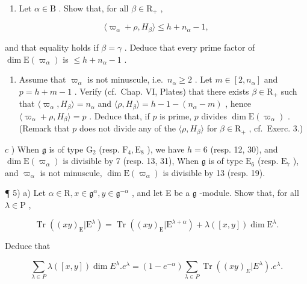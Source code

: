 \begin{enumerate}
\def\labelenumi{\alph{enumi})}
\tightlist
\item
  Let \(\alpha \in \mathrm{B}\) . Show that, for all \(\beta \in \mathrm{R}_{+}\) ,
\end{enumerate}

\[
\langle \varpi_ {\alpha} + \rho , H _ {\beta} \rangle \leq h + n _ {\alpha} - 1,
\]

and that equality holds if \(\beta = \gamma\) . Deduce that every prime factor of \(\dim \mathrm{E}(\varpi_{\alpha})\) is \(\leq h + n_{\alpha} - 1\) .

\begin{enumerate}
\def\labelenumi{\alph{enumi})}
\setcounter{enumi}{1}
\tightlist
\item
  Assume that \(\varpi_{\alpha}\) is not minuscule, i.e.~\(n_{\alpha} \geq 2\) . Let \(m \in [2, n_{\alpha}]\) and \(p = h + m - 1\) . Verify (cf.~Chap. VI, Plates) that there exists \(\beta \in \mathrm{R}_{+}\) such that \(\langle \varpi_{\alpha}, H_{\beta} \rangle = n_{\alpha}\) and \(\langle \rho, H_{\beta} \rangle = h - 1 - (n_{\alpha} - m)\) , hence \(\langle \varpi_{\alpha} + \rho, H_{\beta} \rangle = p\) . Deduce that, if \(p\) is prime, \(p\) divides \(\dim \mathrm{E}(\varpi_{\alpha})\) . (Remark that \(p\) does not divide any of the \(\langle \rho, H_{\beta} \rangle\) for \(\beta \in \mathrm{R}_{+}\) , cf.~Exerc. 3.)
\end{enumerate}

\(c\) ) When \(\mathfrak{g}\) is of type \(\mathrm{G}_2\) (resp. \(\mathrm{F}_4,\mathrm{E}_8\) ), we have \(h = 6\) (resp. 12, 30), and \(\dim \mathrm{E}(\varpi_{\alpha})\) is divisible by 7 (resp. 13, 31), When \(\mathfrak{g}\) is of type \(\mathrm{E}_6\) (resp. \(\mathrm{E}_7\) ), and \(\varpi_{\alpha}\) is not minuscule, \(\dim \mathrm{E}(\varpi_{\alpha})\) is divisible by 13 (resp. 19).

¶ 5) a) Let \(\alpha \in \mathrm{R}, x \in \mathfrak{g}^{\alpha}, y \in \mathfrak{g}^{-\alpha}\) , and let E be a \(\mathfrak{g}\) -module. Show that, for all \(\lambda \in \mathrm{P}\) ,

\[
\operatorname{Tr} ((x y) _ {\mathrm{E}} | \mathrm{E} ^ {\lambda}) = \operatorname{Tr} ((x y) _ {\mathrm{E}} | \mathrm{E} ^ {\lambda + \alpha}) + \lambda ([ x, y ]) \dim \mathrm{E} ^ {\lambda}.
\]

Deduce that

\[
\sum_ {\lambda \in P} \lambda ([ x, y ]) \dim E ^ {\lambda}. e ^ {\lambda} = (1 - e ^ {- \alpha}) \sum_ {\lambda \in P} \operatorname{Tr} ((x y) _ {E} | E ^ {\lambda}). e ^ {\lambda}.
\]

